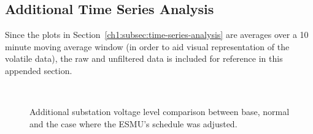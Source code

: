 \subsection{Additional Time Series Analysis}
\label{appx-a:ch1:additional-time-series-analysis}

Since the plots in Section~\ref{ch1:subsec:time-series-analysis} are averages over a 10 minute moving average window (in order to aid visual representation of the volatile data), the raw and unfiltered data is included for reference in this appended section.

\begin{figure}\centering
{}\\	
\caption{Additional substation voltage level comparison between base, normal and the case where the ESMU's schedule was adjusted.}
\end{figure}

